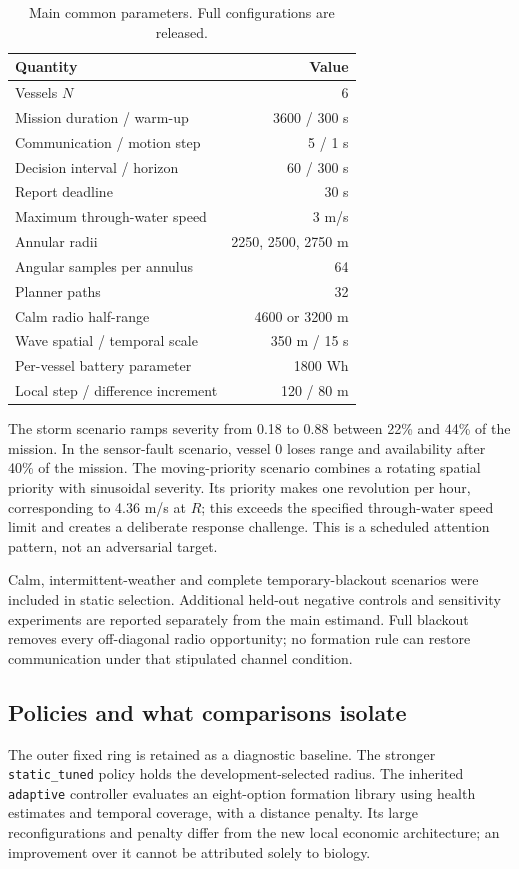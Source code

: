 \begin{table}[t]
\centering\small
\caption{Main common parameters. Full configurations are released.}
\label{tab:parameters}
\begin{tabular}{@{}p{}r@{}}
\toprule
Quantity & Value\\
\midrule
Vessels $N$ & 6\\
Mission duration / warm-up & 3600 / 300 s\\
Communication / motion step & 5 / 1 s\\
Decision interval / horizon & 60 / 300 s\\
Report deadline & 30 s\\
Maximum through-water speed & 3 m/s\\
Annular radii & 2250, 2500, 2750 m\\
Angular samples per annulus & 64\\
Planner paths & 32\\
Calm radio half-range & 4600 or 3200 m\\
Wave spatial / temporal scale & 350 m / 15 s\\
Per-vessel battery parameter & 1800 Wh\\
Local step / difference increment & 120 / 80 m\\
\bottomrule
\end{tabular}
\end{table}

The storm scenario ramps severity from 0.18 to 0.88 between 22\% and 44\% of the
mission. In the sensor-fault scenario, vessel 0 loses range and availability
after 40\% of the mission. The moving-priority scenario combines a rotating
spatial priority with sinusoidal severity. Its priority makes one revolution
per hour, corresponding to 4.36 m/s at $R$; this exceeds the specified
through-water speed limit and creates a deliberate response challenge.
This is a scheduled attention pattern, not an adversarial target.

Calm, intermittent-weather and complete temporary-blackout scenarios were
included in static selection. Additional held-out negative controls and
sensitivity experiments are reported separately from the main estimand.
Full blackout removes every off-diagonal radio opportunity; no formation rule
can restore communication under that stipulated channel condition.

\subsection{Policies and what comparisons isolate}
The outer fixed ring is retained as a diagnostic baseline. The stronger
\texttt{static\_tuned} policy holds the development-selected radius. The inherited
\texttt{adaptive} controller evaluates an eight-option formation library using
health estimates and temporal coverage, with a distance penalty. Its large
reconfigurations and penalty differ from the new local economic architecture;
an improvement over it cannot be attributed solely to biology.

